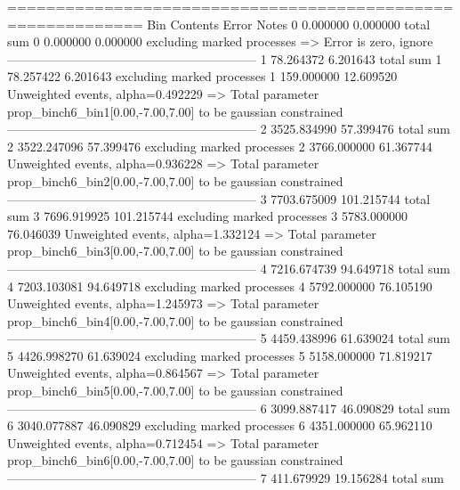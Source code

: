 ============================================================
Bin        Contents        Error           Notes                         
0          0.000000        0.000000        total sum                     
0          0.000000        0.000000        excluding marked processes    
  => Error is zero, ignore      
------------------------------------------------------------
1          78.264372       6.201643        total sum                     
1          78.257422       6.201643        excluding marked processes    
1          159.000000      12.609520       Unweighted events, alpha=0.492229
  => Total parameter prop_binch6_bin1[0.00,-7.00,7.00] to be gaussian constrained
------------------------------------------------------------
2          3525.834990     57.399476       total sum                     
2          3522.247096     57.399476       excluding marked processes    
2          3766.000000     61.367744       Unweighted events, alpha=0.936228
  => Total parameter prop_binch6_bin2[0.00,-7.00,7.00] to be gaussian constrained
------------------------------------------------------------
3          7703.675009     101.215744      total sum                     
3          7696.919925     101.215744      excluding marked processes    
3          5783.000000     76.046039       Unweighted events, alpha=1.332124
  => Total parameter prop_binch6_bin3[0.00,-7.00,7.00] to be gaussian constrained
------------------------------------------------------------
4          7216.674739     94.649718       total sum                     
4          7203.103081     94.649718       excluding marked processes    
4          5792.000000     76.105190       Unweighted events, alpha=1.245973
  => Total parameter prop_binch6_bin4[0.00,-7.00,7.00] to be gaussian constrained
------------------------------------------------------------
5          4459.438996     61.639024       total sum                     
5          4426.998270     61.639024       excluding marked processes    
5          5158.000000     71.819217       Unweighted events, alpha=0.864567
  => Total parameter prop_binch6_bin5[0.00,-7.00,7.00] to be gaussian constrained
------------------------------------------------------------
6          3099.887417     46.090829       total sum                     
6          3040.077887     46.090829       excluding marked processes    
6          4351.000000     65.962110       Unweighted events, alpha=0.712454
  => Total parameter prop_binch6_bin6[0.00,-7.00,7.00] to be gaussian constrained
------------------------------------------------------------
7          411.679929      19.156284       total sum                     
